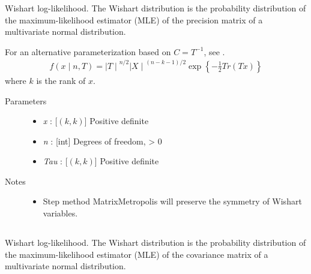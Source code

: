 \documentclass[]{jss}
\begin{document}
Wishart log-likelihood. The Wishart distribution is the probability
distribution of the maximum-likelihood estimator (MLE) of the precision
matrix of a multivariate normal distribution.

For an alternative parameterization based on $C=T^{-1}$, see
.
\begin{eqnarray*}
f(x \mid n, T) = {\mid T \mid}^{n/2}{\mid X \mid}^{(n-k-1)/2} \exp\left\{ -\frac{1}{2} Tr(Tx) \right\}    
\end{eqnarray*}
where $k$ is the rank of $x$.
\begin{description}
\item[Parameters] \leavevmode\begin{itemize}
\item {} 
\emph{x} : [$(k,k)$] Positive definite

\item{} 
\emph{n} : [int] Degrees of freedom, \textgreater{} 0

\item{}
\emph{Tau} : [$(k,k)$] Positive definite

\end{itemize}

\item[Notes]\leavevmode
\begin{itemize}
    \item {}
    Step method MatrixMetropolis will preserve the symmetry of Wishart variables.
\end{itemize}

\end{description}



\subsection[Wishart, covariance parameterization]{ }

Wishart log-likelihood. The Wishart distribution is the probability
distribution of the maximum-likelihood estimator (MLE) of the covariance
matrix of a multivariate normal distribution.
\end{document}
